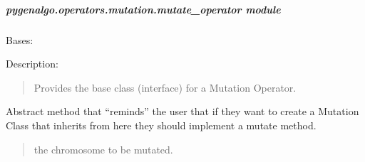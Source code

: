 \documentclass[letterpaper,10pt,english]{sphinxmanual}
\begin{document}
\subparagraph{pygenalgo.operators.mutation.mutate\_operator module}
\label{\detokenize{pygenalgo.operators.mutation:module-pygenalgo.operators.mutation.mutate_operator}}\label{\detokenize{pygenalgo.operators.mutation:pygenalgo-operators-mutation-mutate-operator-module}}

\begin{fulllineitems}
\label{\detokenize{pygenalgo.operators.mutation:pygenalgo.operators.mutation.mutate_operator.MutationOperator}}
\pysigstartsignatures
{}
\pysigstopsignatures
\sphinxAtStartPar
Bases: {\hyperref[\detokenize{pygenalgo.operators:pygenalgo.operators.genetic_operator.GeneticOperator}]{}}

\sphinxAtStartPar
Description:
\begin{quote}

\sphinxAtStartPar
Provides the base class (interface) for a Mutation Operator.
\end{quote}

\begin{fulllineitems}
\label{\detokenize{pygenalgo.operators.mutation:pygenalgo.operators.mutation.mutate_operator.MutationOperator.mutate}}
\pysigstartsignatures
{}
\pysigstopsignatures
\sphinxAtStartPar
Abstract method that “reminds” the user that if they want to
create a Mutation Class that inherits from here they should
implement a mutate method.
\begin{quote}\begin{description}
\sphinxAtStartPar
{} \textendash{} the chromosome to be mutated.


\end{description}
\end{quote}
\end{fulllineitems}
\end{fulllineitems}
\end{document}
